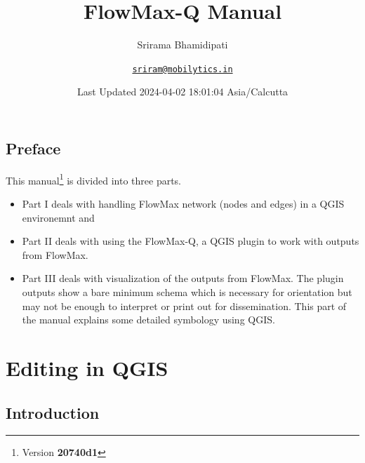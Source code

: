 \documentclass[
]{book}
\title{FlowMax-Q Manual}
\author{Srirama Bhamidipati \and \href{mailto:sriram@mobilytics.in}{\nolinkurl{sriram@mobilytics.in}}}
\date{Last Updated 2024-04-02 18:01:04 Asia/Calcutta}
\providecommand{\tightlist}{%
  \setlength{\itemsep}{0pt}\setlength{\parskip}{0pt}}
\begin{document}
\maketitle

{
\setcounter{tocdepth}{1}
\tableofcontents
}
\chapter*{Preface}\label{preface}

This manual\footnote{Version \textbf{20740d1}} is divided into three parts.

\begin{itemize}
\tightlist
\item
  Part I deals with handling FlowMax network (nodes and edges) in a QGIS environemnt and
\item
  Part II deals with using the FlowMax-Q, a QGIS plugin to work with outputs from FlowMax.
\item
  Part III deals with visualization of the outputs from FlowMax. The plugin outputs show a bare minimum schema which is necessary for orientation but may not be enough to interpret or print out for dissemination. This part of the manual explains some detailed symbology using QGIS.
\end{itemize}

\part{Editing in QGIS}\label{part-editing-in-qgis}

\chapter{Introduction}\label{introduction}
\end{document}
